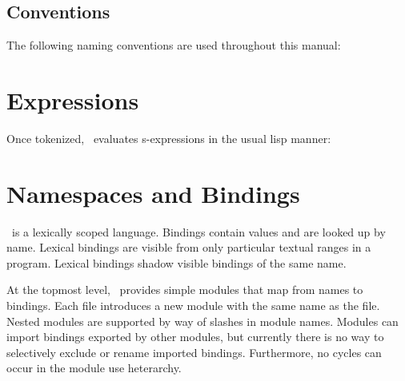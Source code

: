 \documentclass[twoside,twocolumn,9pt]{extarticle}
\begin{document}
\subsection{Conventions}

The following naming conventions are used throughout this manual:

\begin{defs}
\end{defs}

\section{Expressions}

Once tokenized, \goo\ evaluates s-expressions in the usual lisp manner:

\begin{defs}
\end{defs}

\section{Namespaces and Bindings}

\goo\ is a lexically scoped language.  Bindings contain values and are
looked up by name.  Lexical bindings are
visible from only particular textual ranges in a program.  Lexical
bindings shadow visible bindings of the same name.

At the topmost level, \goo\ provides simple modules that map from
names to bindings.  Each file introduces a new module with the same
name as the file.  Nested modules are supported by way of slashes in
module names.  Modules can import bindings exported by other modules,
but currently there is no way to selectively exclude or rename
imported bindings.  Furthermore, no cycles can occur in the module use
heterarchy.
\end{document}

